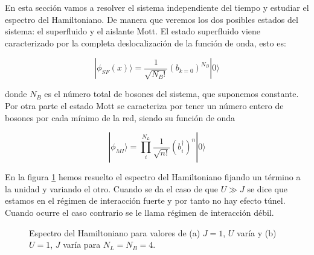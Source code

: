 \documentclass[11pt,a4paper]{article}
\begin{document}
En esta sección vamos a resolver el sistema independiente del tiempo y estudiar el espectro del Hamiltoniano. De manera que veremos los dos posibles estados del sistema: el superfluido y el aislante Mott. El estado superfluido viene caracterizado por la completa deslocalización de la función de onda, esto es:

\begin{equation}
  |\phi_{SF}(x)\rangle=\frac{1}{\sqrt{N_B!}}(b_{k=0})^{N_B}|0\rangle
\end{equation}

donde $N_B$ es el número total de bosones del sistema, que suponemos constante. Por otra parte el estado Mott se caracteriza por tener un número entero de bosones por cada mínimo de la red, siendo su función de onda

\begin{equation}
  |\phi_{MI}\rangle=\prod_i^{N_L}\frac{1}{\sqrt{n!}}(b_i^{\dagger})^n|0\rangle
\end{equation}


En la figura \ref{f:comparacion} hemos resuelto el espectro del Hamiltoniano fijando un término a la unidad y variando el otro. Cuando se da el caso de que $U\gg J$ se dice que estamos en el régimen de interacción fuerte y por tanto no hay efecto túnel. Cuando ocurre el caso contrario se le llama régimen de interacción débil.


\begin{figure} [h]
 \centering
  \caption{Espectro del Hamiltoniano para valores de (a) $J=1$, $U$ varía y (b) $U=1$, $J$ varía para $N_L=N_B=4$.}
 \label{f:comparacion}
\end{figure}
\end{document}
